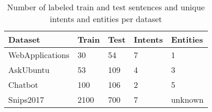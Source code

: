 \begin{table}
    \centering
    \begin{tabular}{l l l l l}
        \textbf{Dataset} & \textbf{Train} & \textbf{Test} & \textbf{Intents} & \textbf{Entities}\\
        \hline
        WebApplications & 30 & 54 & 7 & 1\\
        AskUbuntu & 53 & 109 & 4 & 3\\
        Chatbot & 100 & 106 & 2 & 5\\
        Snips2017 & 2100 & 700 & 7 & unknown\\
    \end{tabular}
    \caption{Number of labeled train and test sentences and unique intents and entities per dataset}
    \label{tab:corpora}
\end{table}
